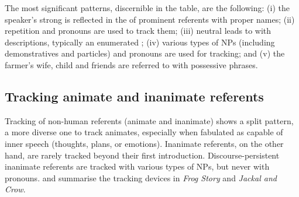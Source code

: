 \documentclass[output=paper
,modfonts
,nonflat]{langsci/langscibook}
\begin{document}

\noindent
The most significant patterns, discernible in the table, are the following: (i) the speaker's strong  is reflected in the  of prominent referents with proper names; (ii) repetition and pronouns are used to track them; (iii) neutral  leads to  with descriptions, typically an enumerated ; (iv) various types of NPs (including demonstratives and particles) and pronouns are used for tracking; and (v) the farmer's wife, child and friends are referred to with possessive phrases.

\subsection{Tracking animate and inanimate referents}\label{TrackAnimate}

Tracking of non-human referents (animate and inanimate) shows a split pattern, a more diverse one to track animates, especially when fabulated as capable of inner speech (thoughts, plans, or emotions). Inanimate referents, on the other hand, are rarely tracked beyond their first introduction. Discourse-persistent inanimate referents are tracked with various types of NPs, but never with pronouns.  and  summarise the tracking devices in \emph{Frog Story} and \emph{Jackal and Crow}.
\end{document}
